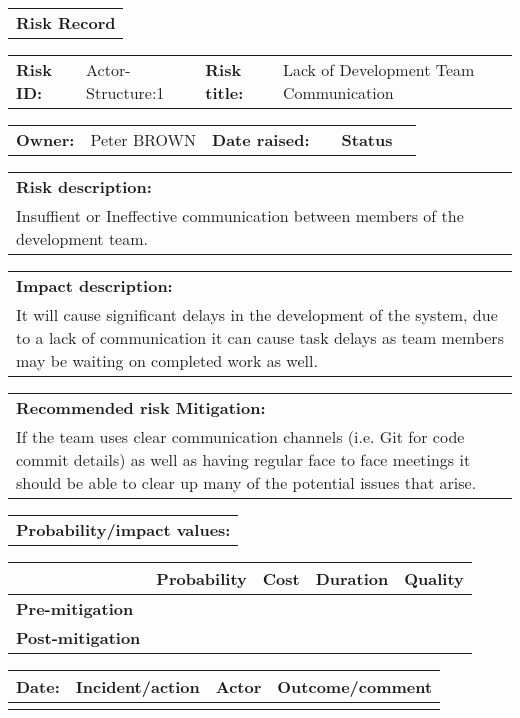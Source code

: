 \begin{table}%
	\begin{tabularx}{\textwidth}{| X |}
		\hline
		\textbf{Risk Record} \\
	\end{tabularx}
	\begin{tabularx}{\textwidth}{| l | X | l | X |}
		\hline
		\textbf{Risk ID:} & Actor-Structure:1 & \textbf{Risk title:} & Lack of Development Team Communication \\
	\end{tabularx}
	\begin{tabularx}{\textwidth}{| l | X | l | X | l | X |}
		\hline
		\textbf{Owner:} & Peter BROWN & \textbf{Date raised:} &  & \textbf{Status} &  \\
	\end{tabularx}
	\begin{tabularx}{\textwidth}{| X |}
		\hline
		\textbf{Risk description:} \\ Insuffient or Ineffective communication between members of the development team. \\
	\end{tabularx}
	\begin{tabularx}{\textwidth}{| X |}
		\hline
		\textbf{Impact description:} \\ It will cause significant delays in the development of the system, due to a lack of communication it can cause task delays as team members may be waiting on completed work as well. \\
	\end{tabularx}
	\begin{tabularx}{\textwidth}{| X |}
		\hline
		\textbf{Recommended risk Mitigation:} \\ If the team uses clear communication channels (i.e. Git for code commit details) as well as having regular face to face meetings it should be able to clear up many of the potential issues that arise.  \\
	\end{tabularx}
	\begin{tabularx}{\textwidth}{| X |}
		\hline
		\textbf{Probability/impact values:} \\
	\end{tabularx}
	\begin{tabularx}{\textwidth}{| l | l | X | X | X |}
		\hline
		 &  \textbf{Probability} & \textbf{Cost} & \textbf{Duration} & \textbf{Quality} \\ \hline
		\textbf{Pre-mitigation} & & & & \\ \hline
		\textbf{Post-mitigation} & & & & \\ \hline \hline
	\end{tabularx}
	\begin{tabularx}{\textwidth}{| l | X | l | X |}
		\hline
		\textbf{Date:} & \textbf{Incident/action} & \textbf{Actor} & \textbf{Outcome/comment} \\ \hline
		 &  &  &  \\ \hline
	\end{tabularx}
\end{table}

